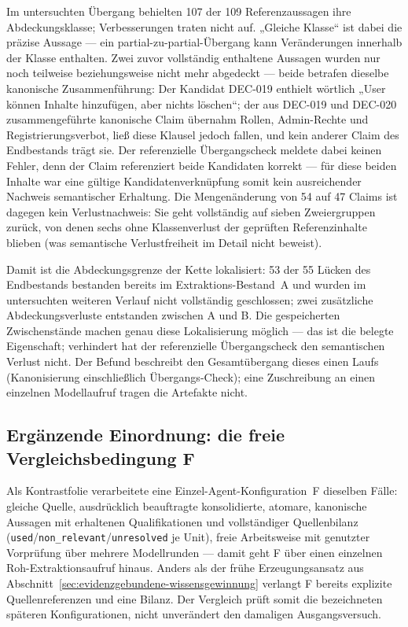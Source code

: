 Im untersuchten Übergang behielten 107 der 109 Referenzaussagen
ihre Abdeckungsklasse; Verbesserungen traten nicht auf. „Gleiche
Klasse`` ist dabei die präzise Aussage --- ein
partial-zu-partial-Übergang kann Veränderungen innerhalb der
Klasse enthalten. Zwei zuvor vollständig enthaltene Aussagen
wurden nur noch teilweise beziehungsweise nicht mehr abgedeckt
--- beide betrafen dieselbe kanonische Zusammenführung: Der
Kandidat DEC-019 enthielt wörtlich „User können Inhalte
hinzufügen, aber nichts löschen``; der aus DEC-019 und DEC-020
zusammengeführte kanonische Claim übernahm Rollen, Admin-Rechte
und Registrierungsverbot, ließ diese Klausel jedoch fallen, und
kein anderer Claim des Endbestands trägt sie. Der referenzielle
Übergangscheck meldete dabei keinen Fehler, denn der Claim
referenziert beide Kandidaten korrekt --- für diese beiden
Inhalte war eine gültige Kandidatenverknüpfung somit kein
ausreichender Nachweis semantischer Erhaltung. Die Mengenänderung
von 54 auf 47 Claims ist dagegen kein Verlustnachweis: Sie geht
vollständig auf sieben Zweiergruppen zurück, von denen sechs ohne
Klassenverlust der geprüften Referenzinhalte blieben (was
semantische Verlustfreiheit im Detail nicht beweist).

Damit ist die Abdeckungsgrenze der Kette lokalisiert: 53 der 55
Lücken des Endbestands bestanden bereits im Extraktions-Bestand~A
und wurden im untersuchten weiteren Verlauf nicht vollständig
geschlossen; zwei zusätzliche Abdeckungsverluste entstanden
zwischen A und B. Die gespeicherten Zwischenstände machen genau
diese Lokalisierung möglich --- das ist die belegte Eigenschaft;
verhindert hat der referenzielle Übergangscheck den semantischen
Verlust nicht. Der Befund beschreibt den Gesamtübergang dieses
einen Laufs (Kanonisierung einschließlich Übergangs-Check); eine
Zuschreibung an einen einzelnen Modellaufruf tragen die Artefakte
nicht.

\subsection{Ergänzende Einordnung: die freie Vergleichsbedingung F}
\label{sec:eval-armf}

Als Kontrastfolie verarbeitete eine Einzel-Agent-Konfiguration~F
dieselben Fälle: gleiche Quelle, ausdrücklich beauftragte
konsolidierte, atomare, kanonische Aussagen mit erhaltenen
Qualifikationen und vollständiger Quellenbilanz
(\texttt{used}/\texttt{non\_relevant}/\texttt{unresolved} je
Unit), freie Arbeitsweise mit genutzter Vorprüfung über mehrere
Modellrunden --- damit geht F über einen einzelnen Roh-Extraktionsaufruf hinaus.
Anders als der frühe Erzeugungsansatz aus
Abschnitt~\ref{sec:evidenzgebundene-wissensgewinnung} verlangt F
bereits explizite Quellenreferenzen und eine Bilanz. Der Vergleich
prüft somit die bezeichneten späteren Konfigurationen, nicht
unverändert den damaligen Ausgangsversuch.

